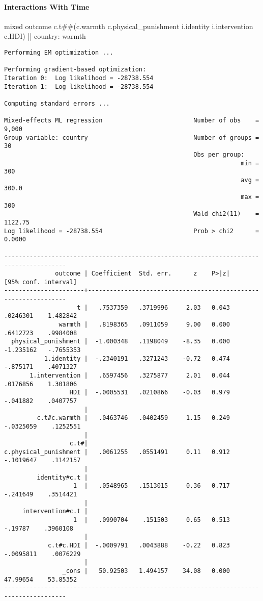 \documentclass[
  letterpaper,
  DIV=11,
  numbers=noendperiod]{scrreprt}
\let\oldparagraph\paragraph
\renewcommand{\paragraph}[1]{\oldparagraph{#1}\mbox{}}
\newenvironment{Shaded}{\begin{snugshade}}{\end{snugshade}}
\newcommand{\KeywordTok}[1]{\textcolor[rgb]{0.00,0.23,0.31}{#1}}
\newcommand{\NormalTok}[1]{\textcolor[rgb]{0.00,0.23,0.31}{#1}}
\begin{document}
\paragraph{Interactions With Time}\label{interactions-with-time}

\begin{Shaded}
\begin{Highlighting}[]
\NormalTok{mixed outcome c.t\#\#(c.warmth c.physical\_punishment i.}\KeywordTok{identity}\NormalTok{ i.intervention c.HDI) || country: warmth}
\end{Highlighting}
\end{Shaded}

\begin{verbatim}
Performing EM optimization ...

Performing gradient-based optimization: 
Iteration 0:  Log likelihood = -28738.554  
Iteration 1:  Log likelihood = -28738.554  

Computing standard errors ...

Mixed-effects ML regression                         Number of obs    =   9,000
Group variable: country                             Number of groups =      30
                                                    Obs per group:
                                                                 min =     300
                                                                 avg =   300.0
                                                                 max =     300
                                                    Wald chi2(11)    = 1122.75
Log likelihood = -28738.554                         Prob > chi2      =  0.0000

---------------------------------------------------------------------------------------
              outcome | Coefficient  Std. err.      z    P>|z|     [95% conf. interval]
----------------------+----------------------------------------------------------------
                    t |   .7537359   .3719996     2.03   0.043     .0246301    1.482842
               warmth |   .8198365   .0911059     9.00   0.000     .6412723    .9984008
  physical_punishment |  -1.000348   .1198049    -8.35   0.000    -1.235162   -.7655353
           1.identity |  -.2340191   .3271243    -0.72   0.474     -.875171    .4071327
       1.intervention |   .6597456   .3275877     2.01   0.044     .0176856    1.301806
                  HDI |  -.0005531   .0210866    -0.03   0.979     -.041882    .0407757
                      |
         c.t#c.warmth |   .0463746   .0402459     1.15   0.249    -.0325059    .1252551
                      |
                  c.t#|
c.physical_punishment |   .0061255   .0551491     0.11   0.912    -.1019647    .1142157
                      |
         identity#c.t |
                   1  |   .0548965   .1513015     0.36   0.717     -.241649    .3514421
                      |
     intervention#c.t |
                   1  |   .0990704    .151503     0.65   0.513      -.19787    .3960108
                      |
            c.t#c.HDI |  -.0009791   .0043888    -0.22   0.823    -.0095811    .0076229
                      |
                _cons |   50.92503   1.494157    34.08   0.000     47.99654    53.85352
---------------------------------------------------------------------------------------


\end{verbatim}
\end{document}
